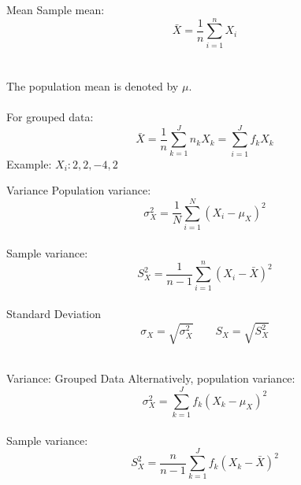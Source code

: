 \documentclass{./../div_teaching_slides}
\begin{document}
\begin{frame}{Mean}
Sample mean:
$$ \bar{X} = \frac{1}{n}\sum_{i=1}^n X_i $$ \\~\\
The population mean is denoted by $\mu$. \\~\\
For grouped data:
 $$ \bar{X} =\frac{1}{n} \sum_{k=1}^J n_k X_k = \sum_{i=1}^J f_k X_k $$ 
 Example: $X_i: 2, 2, -4, 2$
\end{frame}

\begin{frame}{Variance}
Population variance:
$$ \sigma_X^2 = \frac{1}{N} \sum_{i=1}^N (X_i-\mu_X)^2 $$ \\
\vspace{0.5em}
Sample variance:
$$ S_X^2 = \frac{1}{n-1} \sum_{i=1}^n (X_i-\bar{X})^2 $$ \\
\vspace{0.5em}
Standard Deviation
$$ \sigma_X = \sqrt{\sigma_X^2} \quad \quad S_X = \sqrt{S_X^2} $$ \\
\end{frame}

\begin{frame}{Variance: Grouped Data}
Alternatively, population variance:
$$ \sigma_X^2 = \sum_{k=1}^J f_k (X_k-\mu_X)^2 $$  \\
\vspace{1cm}
Sample variance:
$$ S_X^2 = \frac{n}{n-1} \sum_{k=1}^J f_k (X_k-\bar{X})^2 $$
\end{frame}
\end{document}
